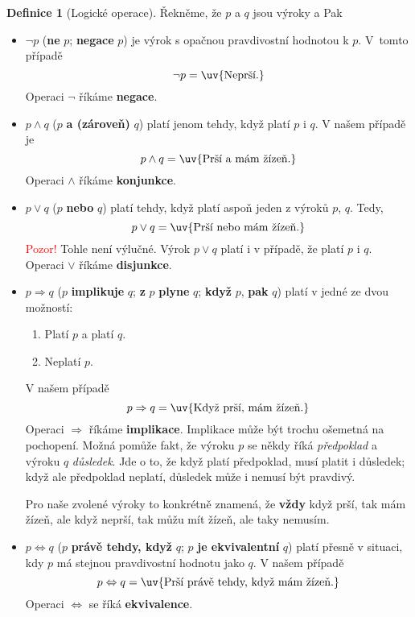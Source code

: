 \documentclass[a4paper,11pt]{article}
\theoremstyle{definition}
\newtheorem{dfn}[thm]{Definice}
\theoremstyle{plain}
\begin{document}
\begin{dfn}[Logické operace]
 Řekněme, že $p$ a $q$ jsou výroky  a  Pak
 \begin{itemize}
  \item $\neg p$ (\textbf{ne} $p$; \textbf{negace} $p$) je výrok s opačnou
   pravdivostní hodnotou k $p$. V~tom\-to případě
   \[
    \neg p = \text{\uv{Neprší.}}
   \]
   Operaci $\neg$ říkáme \textbf{negace}.
  \item $p \wedge q$ ($p$ \textbf{a (zároveň)} $q$) platí jenom tehdy, když
   platí $p$ i $q$. V našem případě je
   \[
    p \wedge q = \text{\uv{Prší a mám žízeň.}}
   \]
   Operaci $ \wedge $ říkáme \textbf{konjunkce}.
  \item $p \vee q$ ($p$ \textbf{nebo} $q$) platí tehdy, když platí aspoň jeden z
   výroků $p$, $q$. Tedy, \[
    p \vee q = \text{\uv{Prší nebo mám žízeň.}}
   \]
   \textcolor{red}{Pozor!} Tohle  není výlučné. Výrok $p \vee q$ platí
   i v případě, že platí $p$ i $q$. Operaci $ \vee $ říkáme \textbf{disjunkce}.
  \item $p \Rightarrow q$ ($p$ \textbf{implikuje} $q$; \textbf{z} $p$ 
   \textbf{plyne} $q$; \textbf{když} $p$, \textbf{pak} $q$) platí v jedné ze
   dvou možností:
   \begin{enumerate}[label=(\arabic*)]
    \item Platí $p$ a platí $q$.
    \item Neplatí $p$.
   \end{enumerate}
   V našem případě
   \[
    p \Rightarrow q = \text{\uv{Když prší, mám žízeň.}}
   \]
   Operaci $ \Rightarrow $ říkáme \textbf{implikace}. Implikace může být trochu
   ošemetná na pochopení. Možná pomůže fakt, že výroku $p$ se někdy říká 
   \emph{předpoklad} a výroku $q$ \emph{důsledek}. Jde o to, že když platí
   předpoklad, musí platit i důsledek; když ale předpoklad neplatí, důsledek
   může i nemusí být pravdivý.

   Pro naše zvolené výroky to konkrétně znamená, že \textbf{vždy} když prší, tak
   mám žízeň, ale když neprší, tak můžu mít žízeň, ale taky nemusím. \item $p
   \Leftrightarrow q$ ($p$ \textbf{právě tehdy, když} $q$; $p$ \textbf{je
   ekvivalentní} $q$) platí přesně v situaci, kdy $p$ má stejnou pravdivostní
   hodnotu jako $q$. V našem případě
   \[
    p \Leftrightarrow q = \text{\uv{Prší právě tehdy, když mám žízeň.}}
   \]
   Operaci $ \Leftrightarrow $ se říká \textbf{ekvivalence}.
 \end{itemize}
\end{dfn}
\end{document}

